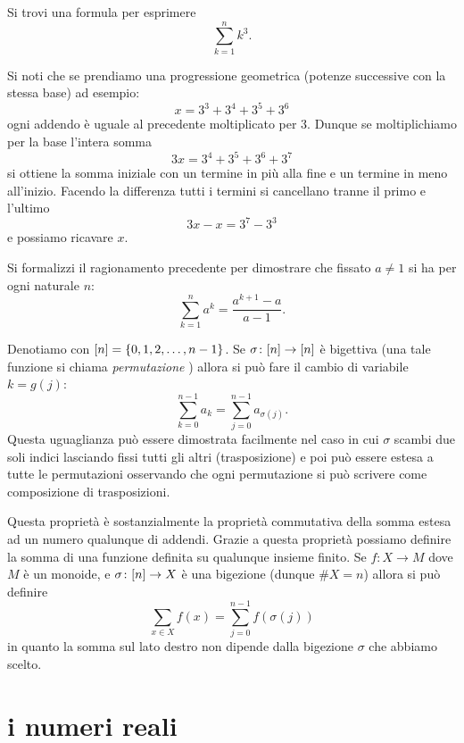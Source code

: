 \begin{exercise}
  Si trovi una formula per esprimere
  \[
  \sum_{k=1}^n k^3.
  \]
\end{exercise}

\begin{exercise}
Si noti che se prendiamo una progressione geometrica 
(potenze successive con la stessa base) 
ad esempio:
\[
  x = 3^3 + 3^4 + 3^5 + 3^6
\]
ogni addendo è uguale al precedente moltiplicato per $3$.
Dunque se moltiplichiamo per la base l'intera somma
\[
  3x = 3^4 + 3^5 + 3^6 + 3^7
\]
si ottiene la somma iniziale con un termine in più alla fine 
e un termine in meno all'inizio. 
Facendo la differenza tutti i termini si cancellano tranne 
il primo e l'ultimo
\[
 3x - x = 3^7 - 3^3  
\]
e possiamo ricavare $x$.

Si formalizzi il ragionamento precedente per dimostrare che 
fissato $a\neq 1$ si ha per ogni naturale $n$:
  \[
    \sum_{k=1}^n a^k = \frac{a^{k+1}-a}{a-1}.  
  \] 
\end{exercise}

Denotiamo con ${\left[ n \right]} = {\left\{ 0,1,2, \dots, n-1 \right\}}$.
Se $\sigma\colon {\left[ n \right]} \to {\left[ n \right]}$
è bigettiva (una tale funzione si chiama \emph{permutazione}%
%
)
allora si può fare il cambio di variabile $k=g(j)$:
\[
    \sum_{k=0}^{n-1} a_k = \sum_{j=0}^{n-1} a_{\sigma(j)}.
\]
Questa uguaglianza può essere dimostrata facilmente nel caso 
in cui $\sigma$ scambi due soli indici lasciando fissi tutti gli altri 
(trasposizione) e poi può essere estesa a tutte le permutazioni
osservando che ogni permutazione si può scrivere come composizione 
di trasposizioni.

Questa proprietà è sostanzialmente la proprietà commutativa della somma 
estesa ad un numero qualunque di addendi.
Grazie a questa proprietà possiamo definire la somma di una funzione 
definita su qualunque insieme finito. 
Se $f\colon X \to M$
dove $M$ è un monoide, 
e $\sigma\colon {\left[ n \right]} \to X$ è una bigezione (dunque $\#X = n$)
allora si può definire 
\[
  \sum_{x\in X} f(x) = \sum_{j=0}^{n-1} f(\sigma(j))  
\]
in quanto la somma sul lato destro non dipende dalla bigezione $\sigma$ che 
abbiamo scelto.

\section{i numeri reali}

